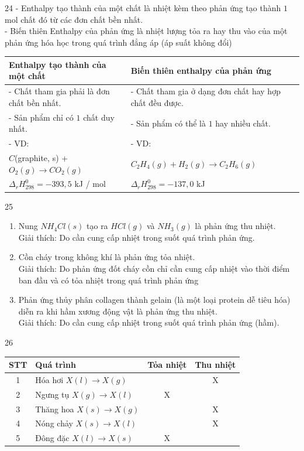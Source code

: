 \def\writeANS{}
\begin{loigiaibth}{24}
  - Enthalpy tạo thành của một chất là nhiệt kèm theo phản ứng tạo thành $1$ mol chất đó từ các đơn chất bền nhất. \\ - Biến thiên Enthalpy của phản ứng là nhiệt lượng tỏa ra hay thu vào của một phản ứng hóa học trong quá trình đẳng áp (áp suất không đổi) \par \begin {tabular}{|l|l|} \hline \textbf {Enthalpy tạo thành của một chất} & \textbf {Biến thiên enthalpy của phản ứng} \\ \hline - Chất tham gia phải là đơn chất bền nhất. & - Chất tham gia ở dạng đơn chất hay hợp chất đều được. \\ \hline - Sản phẩm chỉ có $1$ chất duy nhất. & - Sản phẩm có thể là $1$ hay nhiều chất. \\ \hline - VD: & - VD: \\ $C$(graphite, s) + $O_2(g) \longrightarrow CO_2(g)$ & $C_2H_4(g) + H_2(g) \longrightarrow C_2H_6(g)$ \\ $\Delta _r H_{298}^0 = -393{,}5$ kJ / mol & $\Delta _r H_{298}^0 = -137{,}0$ kJ \\ \hline \end {tabular}
\end{loigiaibth}
\def\writeANS{}
\begin{loigiaibth}{25}
  \begin {enumerate} \item Nung $NH_4Cl(s)$ tạo ra $HCl(g)$ và $NH_3(g)$ là phản ứng thu nhiệt. \\ Giải thích: Do cần cung cấp nhiệt trong suốt quá trình phản ứng. \item Cồn cháy trong không khí là phản ứng tỏa nhiệt. \\ Giải thích: Do phản ứng đốt cháy cồn chỉ cần cung cấp nhiệt vào thời điểm ban đầu và có tỏa nhiệt trong quá trình phản ứng \item Phản ứng thủy phân collagen thành gelain (là một loại protein dễ tiêu hóa) diễn ra khi hầm xương động vật là phản ứng thu nhiệt. \\ Giải thích: Do cần cung cấp nhiệt trong suốt quá trình phản ứng (hầm). \end {enumerate}
\end{loigiaibth}
\def\writeANS{}
\begin{loigiaibth}{26}
  \centering \begin {tabular}{|c|l|c|c|} \hline STT & Quá trình & Tỏa nhiệt & Thu nhiệt \\ \hline 1 & Hóa hơi $X(l) \longrightarrow X(g)$ & & X \\ \hline 2 & Ngưng tụ $X(g) \longrightarrow X(l)$ & X & \\ \hline 3 & Thăng hoa $X(s) \longrightarrow X(g)$ & & X \\ \hline 4 & Nóng chảy $X(s) \longrightarrow X(l)$ & & X \\ \hline 5 & Đông đặc $X(l) \longrightarrow X(s)$ & X & \\ \hline \end {tabular}
\end{loigiaibth}
